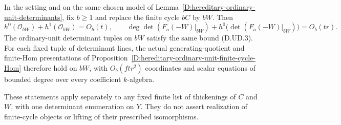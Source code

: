 \begin{corollary}
\label{D:hereditary-generation-cycle-Hom-budget}
In the setting and on the same chosen model of
Lemma~\ref{D:hereditary-ordinary-unit-determinants}, fix $b\ge1$
and replace the finite cycle $bC$ by $bW$. Then
\[
 h^0(\mathcal O_{bW})+h^1(\mathcal O_{bW})=O_b(t),\qquad
 \deg\det(F_a(-W)|_{bW})+
 h^0\bigl(\det(F_a(-W)|_{bW})\bigr)=O_b(tr).
                                                        \tag{D.UW.1}
\]
The ordinary-unit determinant tuples on $bW$ satisfy the same
bound (D.UD.3). For each fixed tuple of determinant lines, the
actual generating-quotient and finite-Hom presentations of
Proposition~\ref{D:hereditary-ordinary-unit-finite-cycle-Hom}
therefore hold on $bW$, with $O_b(ftr^2)$ coordinates and
scalar equations of bounded degree over every coefficient
$k$-algebra.

These statements apply separately to any fixed finite list
of thickenings of $C$ and $W$, with one determinant enumeration
on $Y$. They do not assert realization of finite-cycle objects
or lifting of their prescribed isomorphisms.
\end{corollary}

